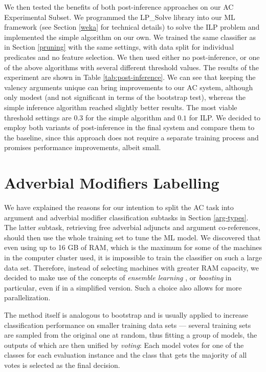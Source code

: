 \documentclass[12pt,notitlepage]{report}
\begin{document}
We then tested the benefits of both post-inference approaches on our AC Experimental Subset. We programmed the LP\_Solve library into our ML framework (see Section \ref{weka} for technical details) to solve the ILP problem and implemented the simple algorithm on our own. We trained the same classifier as in Section \ref{pruning} with the same settings, with data split for individual predicates and no feature selection. We then used either no post-inference, or one of the above algorithms with several different threshold values. The results of the experiment are shown in Table \ref{tab:post-inference}. We can see that keeping the valency arguments unique can bring improvements to our AC system, although only modest (and not significant in terms of the bootstrap test), whereas the simple inference algorithm reached slightly better results. The most viable threshold settings are $0.3$ for the simple algorithm and $0.1$ for ILP. We decided to employ both variants of post-inference in the final system and compare them to the baseline, since this approach does not require a separate training process and promises performance improvements, albeit small.

\section{Adverbial Modifiers Labelling}\label{ac-am}

We have explained the reasons for our intention to split the AC task into argument and adverbial modifier classification subtasks in Section \ref{arg-types}. The latter subtask, retrieving free adverbial adjuncts and argument co-references, should then use the whole training set to tune the ML model. We discovered that even using up to 16 GB of RAM, which is the maximum for some of the machines in the computer cluster used, it is impossible to train the classifier on such a large data set. Therefore, instead of selecting machines with greater RAM capacity, we decided to make use of the concepts of \emph{ensemble learning} \citep[p. 605ff.]{opitz99,hastie09}, or \emph{boosting} \citep[p. 321ff.]{witten05} in particular, even if in a simplified version. Such a choice also allows for more parallelization. 

The method itself is analogous to bootstrap and is usually applied to increase classification performance on smaller training data sets --- several training sets are sampled from the original one at random, thus fitting a group of models, the outputs of which are then unified by \emph{voting}: Each model votes for one of the classes for each evaluation instance and the class that gets the majority of all votes is selected as the final decision. 
\end{document}

